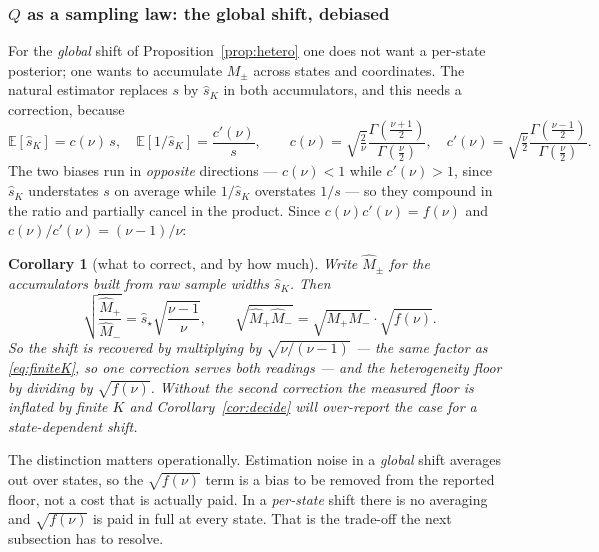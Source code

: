 \documentclass[11pt]{article}
\newtheorem{corollary}[proposition]{Corollary}
\theoremstyle{definition}
\newcommand{\E}{\mathbb{E}}
\begin{document}
\subsubsection*{$Q$ as a sampling law: the global shift, debiased}

For the \emph{global} shift of Proposition~\ref{prop:hetero} one does not want a
per-state posterior; one wants to accumulate $M_\pm$ across states and
coordinates. The natural estimator replaces $s$ by $\hat s_K$ in both
accumulators, and this needs a correction, because
\begin{equation}
  \E[\hat s_K]=c(\nu)\,s,
  \quad
  \E[1/\hat s_K]=\frac{c'(\nu)}{s},
  \qquad
  c(\nu)=\sqrt{\tfrac2\nu}\frac{\Gamma(\frac{\nu+1}{2})}{\Gamma(\frac\nu2)},
  \quad
  c'(\nu)=\sqrt{\tfrac\nu2}\frac{\Gamma(\frac{\nu-1}{2})}{\Gamma(\frac\nu2)} .
  \label{eq:chibias}
\end{equation}
The two biases run in \emph{opposite} directions --- $c(\nu)<1$ while
$c'(\nu)>1$, since $\hat s_K$ understates $s$ on average while $1/\hat s_K$
overstates $1/s$ --- so they compound in the ratio and partially cancel in the
product. Since $c(\nu)c'(\nu)=f(\nu)$ and $c(\nu)/c'(\nu)=(\nu-1)/\nu$:

\begin{corollary}[what to correct, and by how much]
\label{cor:debias}
Write $\widehat{M}_\pm$ for the accumulators built from raw sample widths
$\hat s_K$. Then
\begin{equation}
  \sqrt{\frac{\widehat M_+}{\widehat M_-}}
  =\hat s_\star\sqrt{\frac{\nu-1}{\nu}},
  \qquad
  \sqrt{\widehat M_+\widehat M_-}
  =\sqrt{M_+M_-}\cdot\sqrt{f(\nu)} .
  \label{eq:debias}
\end{equation}
So the shift is recovered by multiplying by $\sqrt{\nu/(\nu-1)}$ --- the
\emph{same} factor as \eqref{eq:finiteK}, so one correction serves both readings
--- and the heterogeneity floor by dividing by $\sqrt{f(\nu)}$. Without the
second correction the measured floor is inflated by finite $K$ and
Corollary~\ref{cor:decide} will over-report the case for a state-dependent shift.
\end{corollary}

The distinction matters operationally. Estimation noise in a \emph{global} shift
averages out over states, so the $\sqrt{f(\nu)}$ term is a bias to be removed
from the reported floor, not a cost that is actually paid. In a \emph{per-state}
shift there is no averaging and $\sqrt{f(\nu)}$ is paid in full at every state.
That is the trade-off the next subsection has to resolve.
\end{document}
